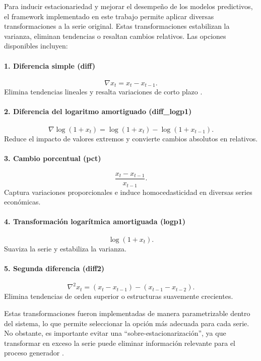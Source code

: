 \documentclass[12pt,letterpaper]{article}
\begin{document}
Para inducir estacionariedad y mejorar el desempeño de los modelos predictivos, el framework 
implementado en este trabajo permite aplicar diversas transformaciones a la serie original. 
Estas transformaciones estabilizan la varianza, eliminan tendencias o resaltan cambios relativos. 
Las opciones disponibles incluyen:

\paragraph{1. Diferencia simple (diff)}
\[
\nabla x_t = x_t - x_{t-1}.
\]
Elimina tendencias lineales y resalta variaciones de corto plazo \cite{hyndman2021forecasting}.

\paragraph{2. Diferencia del logaritmo amortiguado (diff\_logp1)}
\[
\nabla \log(1 + x_t) = \log(1 + x_t) - \log(1 + x_{t-1}).
\]
Reduce el impacto de valores extremos y convierte cambios absolutos en relativos.

\paragraph{3. Cambio porcentual (pct)}
\[
\frac{x_t - x_{t-1}}{x_{t-1}}.
\]
Captura variaciones proporcionales e induce homocedasticidad en diversas series económicas.

\paragraph{4. Transformación logarítmica amortiguada (logp1)}
\[
\log(1+x_t).
\]
Suaviza la serie y estabiliza la varianza.

\paragraph{5. Segunda diferencia (diff2)}
\[
\nabla^2 x_t = (x_t - x_{t-1}) - (x_{t-1} - x_{t-2}).
\]
Elimina tendencias de orden superior o estructuras suavemente crecientes.

Estas transformaciones fueron implementadas de manera parametrizable dentro del sistema, lo que 
permite seleccionar la opción más adecuada para cada serie. No obstante, es importante evitar una 
``sobre-estacionarización'', ya que transformar en exceso la serie puede eliminar información 
relevante para el proceso generador \cite{hyndman2021forecasting}.
\end{document}
